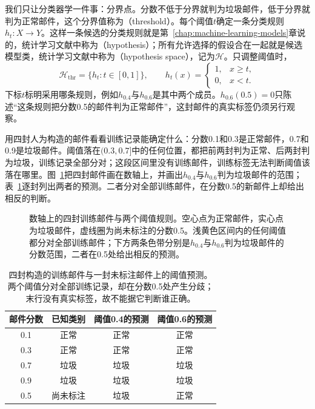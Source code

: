 我们只让分类器学一件事：分界点。分数不低于分界就判为垃圾邮件，低于分界就判为正常邮件，这个分界值称为（threshold）。每个阈值$t$确定一条分类规则$h_t:X\to Y$。这样一条候选的分类规则就是第~\ref{chap:machine-learning-models}章说的，统计学习文献中称为（hypothesis）；所有允许选择的假设合在一起就是候选模型类，统计学习文献中称为（hypothesis space），记为$\mathcal H$。只调整阈值时，
\begin{equation}
 \mathcal H_{\mathrm{thr}}=\{h_t:t\in[0,1]\},\qquad
 h_t(x)=\begin{cases}
  1,&x\geq t,\\
  0,&x<t.
 \end{cases}
 \label{eq:threshold-hypothesis-class}
\end{equation}
下标$t$标明采用哪条规则，例如$h_{0.4}$与$h_{0.6}$是其中两个成员。$h_{0.6}(0.5)=0$只陈述“这条规则把分数0.5的邮件判为正常邮件”，这封邮件的真实标签仍须另行观察。

用四封人为构造的邮件看看训练记录能确定什么：分数0.1和0.3是正常邮件，0.7和0.9是垃圾邮件。阈值落在$(0.3,0.7]$中的任何位置，都把前两封判为正常、后两封判为垃圾，训练记录全部分对；这段区间里没有训练邮件，训练标签无法判断阈值该落在哪里。图~\ref{fig:lt4-threshold-email-line}把四封邮件画在数轴上，并画出$h_{0.4}$与$h_{0.6}$判为垃圾邮件的范围；表~\ref{tab:threshold-email-decisions}逐封列出两者的预测。二者分对全部训练邮件，在分数0.5的新邮件上却给出相反的判断。

\begin{figure}[htbp]
 \centering
 
 \caption{数轴上的四封训练邮件与两个阈值规则。空心点为正常邮件，实心点为垃圾邮件，虚线圈为尚未标注的分数0.5。浅黄色区间内的任何阈值都分对全部训练邮件；下方两条色带分别是$h_{0.4}$与$h_{0.6}$判为垃圾邮件的分数范围，二者在0.5处给出相反的预测。}
 \label{fig:lt4-threshold-email-line}
\end{figure}

\begin{table}[htbp]
 \centering
 \begin{tabular}{cccc}
  \toprule
  邮件分数 & 已知类别 & 阈值0.4的预测 & 阈值0.6的预测\\
  \midrule
  0.1 & 正常 & 正常 & 正常\\
  0.3 & 正常 & 正常 & 正常\\
  0.7 & 垃圾 & 垃圾 & 垃圾\\
  0.9 & 垃圾 & 垃圾 & 垃圾\\
  \midrule
  0.5 & 尚未标注 & 垃圾 & 正常\\
  \bottomrule
 \end{tabular}
 \caption{四封构造的训练邮件与一封未标注邮件上的阈值预测。两个阈值分对全部训练记录，却在分数0.5处产生分歧；末行没有真实标签，故不能据它判断谁正确。}
 \label{tab:threshold-email-decisions}
\end{table}

